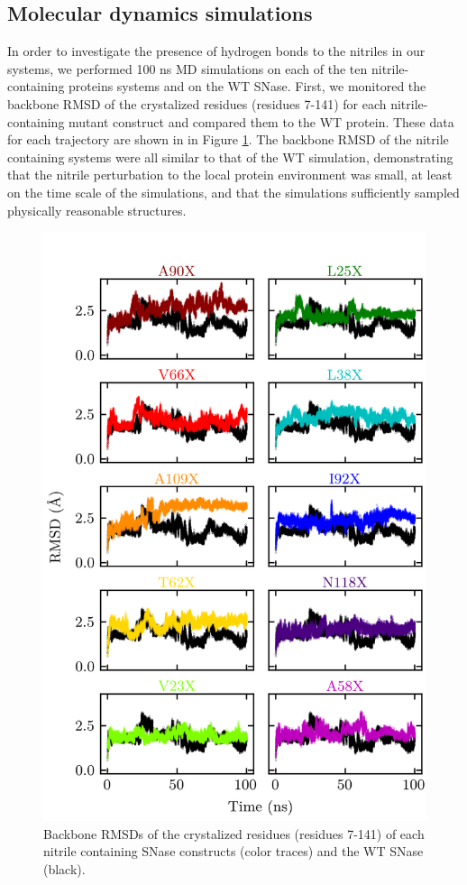 \subsection{Molecular dynamics simulations}

In order to investigate the presence of hydrogen bonds to the nitriles in our systems, we performed 100 ns MD simulations on each of the ten nitrile-containing proteins systems and on the WT SNase. 
First, we monitored the backbone RMSD of the crystalized residues (residues 7-141) for each nitrile-containing mutant construct and compared them to the WT protein. 
These data for each trajectory are shown in in Figure \ref{fig:snase-rmsd}. 
The backbone RMSD of the nitrile containing systems were all similar to that of the WT simulation, demonstrating that the nitrile perturbation to the local protein environment was small, at least on the time scale of the simulations, and that the simulations sufficiently sampled physically reasonable structures.

\begin{figure}
    \center
    \includegraphics[width=\single]{figures-snase/rmsd.png}
    \caption[Backbone RMSDs of nitrile containing SNase constructs]{
        Backbone RMSDs of the crystalized residues (residues 7-141) of each nitrile containing SNase constructs (color traces) and the WT SNase (black).
    }
    \label{fig:snase-rmsd}
\end{figure}

